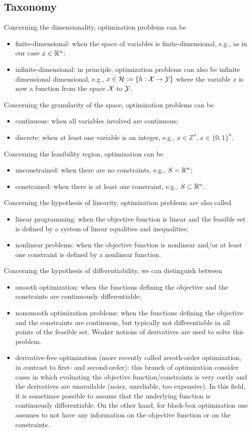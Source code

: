 \documentclass[10pt,a4paper]{article}
\begin{document}
\subsection{Taxonomy}
Concerning the dimensionality, optimization problems can be 
\begin{itemize}
	\item finite-dimensional: when the space of variables is finite-dimensional, e.g., as in our case $x\in\mathbb{R}^n$;
	\item infinite-dimensional: in principle, optimization problems can also be infinite dimensional  dimensional, e.g., $x\in \mathcal{H}:=\{h:\mathcal{X}\to \mathcal{Y}\}$ where the variable $x$ is now a function from the space $\mathcal{X}$ to $\mathcal{Y}$.
\end{itemize}
Concerning the granularity of the space, optimization problems can be 
\begin{itemize}
	\item continuous: when all variables involved are continuous;
	\item discrete: when at least one variable is an integer, e.g., $x\in \mathbb{Z}^n, x\in \{0,1\}^n.$
\end{itemize}
Concerning the feasibility region, optimization can be 
\begin{itemize}
\item unconstrained: when there are no constraints, e.g., $S=\mathbb{R}^n$;
\item constrained: when there is at least one constraint, e.g., $S\subset\mathbb{R}^n$.
\end{itemize}
Concerning the hypothesis of linearity, optimization problems are also called
\begin{itemize}
\item linear programming: when the objective function is linear and the
feasible set is defined by a system of linear equalities and inequalities;
\item nonlinear problems: when the objective function is nonlinear
and/or at least one constraint is defined by a nonlinear function.
\end{itemize}
Concerning the hypothesis of differentiability, we can distinguish between
\begin{itemize}
\item smooth optimization: when the functions defining the objective
and the constraints are continuously differentiable;
\item nonsmooth optimization problems: when the functions defining the objective and the constraints are continuous, but typically not differentiable in all points of the feasible set. Weaker notions of derivatives are used to solve this problem.
\item derivative-free optimization (more recently called zeroth-order optimization, in contrast to first- and second-order): this branch of optimization consider cases in which evaluating the objective function/constraints is very costly and the derivatives are unavailable (noisy, unreliable, too expensive). In this field, it is sometimes possible to assume that the underlying function is continuously differentiable. On the other hand, for black-box optimization one assumes to not have any information on the objective function or on the constraints.
\end{itemize}
\end{document}

